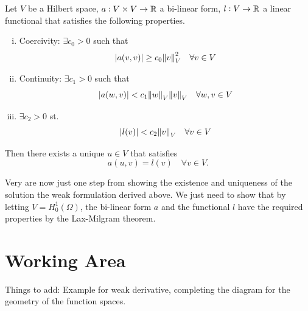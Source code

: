 \begin{theorem}
	Let $ V $ be a Hilbert space, $ a:V\times V \to \mathbb{R} $ a bi-linear form, $ l: V \to \mathbb{R} $ a linear functional that satisfies the following properties.
	\begin{enumerate}[(i)]
		\item Coercivity: $ \exists c_0>0$ such that 
		\[  |a(v,v)| \geq c_0 \norm{v}_V^2 \quad \forall v \in V \]
		\item Continuity: $ \exists c_1>0 $ such that
		\[ |a(w,v)| < c_1 \norm{w}_V\norm{v}_V \quad \forall w,v \in V \]
		\item $ \exists c_2 > 0 $ st.
		\[ |l(v)| < c_2 \norm{v}_V \quad \forall v \in V \]
	\end{enumerate}
	Then there exists a unique $ u \in V $ that satisfies
	\[ a(u,v) = l(v) \quad \forall v \in V. \]
\end{theorem}

Very are now just one step from showing the existence and uniqueness of the solution the weak formulation derived above. We just need to show that by letting $ V = H_0^1(\Omega) $, the bi-linear form $ a $ and the functional $ l $ have the required properties by the Lax-Milgram theorem. 

\section{Working Area}
Things to add: Example for weak derivative, completing the diagram for the geometry of the function spaces. 